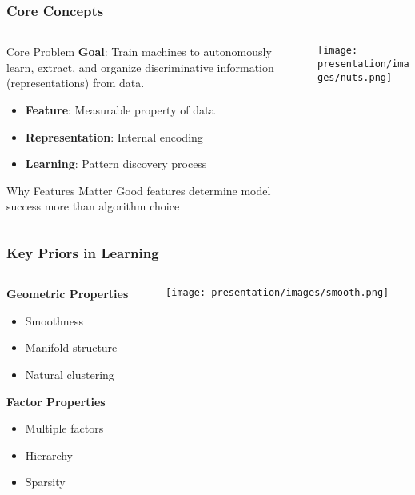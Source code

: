 \documentclass{beamer}
\begin{document}
\begin{frame}[fragile]
\frametitle{Core Concepts}
\begin{columns}
    \begin{column}{0.65\textwidth}
        \begin{block}{Core Problem}
            \textbf{Goal}: Train machines to autonomously learn, extract, and organize discriminative information (representations) from data.
        \end{block}
        \pause

        \begin{itemize}
        \item \textbf{Feature}: Measurable property of data
        \item \textbf{Representation}: Internal encoding
        \item \textbf{Learning}: Pattern discovery process
        \end{itemize}
        \pause

        \begin{alertblock}{Why Features Matter}
        Good features determine model success more than algorithm choice
        \end{alertblock}
    \end{column}
    \pause
    \begin{column}{0.4\textwidth}
        \texttt{[image: presentation/images/nuts.png]}
    \end{column}
\end{columns}
\end{frame}

\begin{frame}[fragile]
\frametitle{Key Priors in Learning}
\begin{columns}
    \begin{column}{0.4\textwidth}
        \textbf{Geometric Properties}
        \begin{itemize}
        \item Smoothness
        \item Manifold structure
        \item Natural clustering
        \end{itemize}
        \pause
        
        \vspace{0.2cm}

        \textbf{Factor Properties}
        \begin{itemize}
        \item Multiple factors
        \item Hierarchy
        \item Sparsity
        \end{itemize}
    \end{column}
    \pause
    
    \begin{column}{0.6\textwidth}
        \texttt{[image: presentation/images/smooth.png]}
    \end{column}
\end{columns}
\end{frame}
\end{document}
